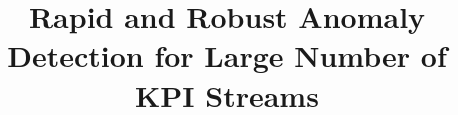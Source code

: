 \documentclass[10pt,journal,compsoc]{IEEEtran}
\begin{document}
\title{Rapid and Robust Anomaly Detection for Large Number of KPI Streams
}

\author{}



\maketitle
	\thispagestyle{fancy}
	\fancyhead{} 
	\lhead{} 
	\cfoot{} 
	\rfoot{}




% 


% 


%




\end{document}
